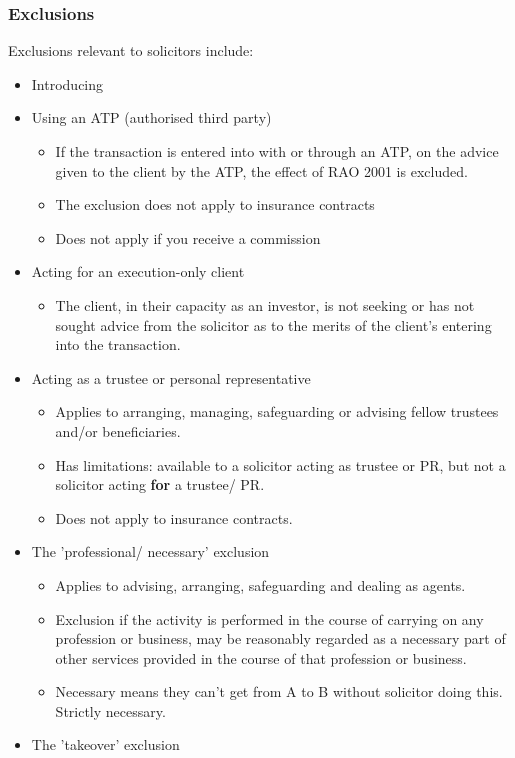 \documentclass[
]{article}
\providecommand{\tightlist}{%
  \setlength{\itemsep}{0pt}\setlength{\parskip}{0pt}}
\begin{document}
\hypertarget{exclusions}{%
\subsubsection{Exclusions}\label{exclusions}}

Exclusions relevant to solicitors include:

\begin{itemize}
\tightlist
\item
  Introducing
\item
  Using an ATP (authorised third party)

  \begin{itemize}
  \tightlist
  \item
    If the transaction is entered into with or through an ATP, on the
    advice given to the client by the ATP, the effect of RAO 2001 is
    excluded.
  \item
    The exclusion does not apply to insurance contracts
  \item
    Does not apply if you receive a commission
  \end{itemize}
\item
  Acting for an execution-only client

  \begin{itemize}
  \tightlist
  \item
    The client, in their capacity as an investor, is not seeking or has
    not sought advice from the solicitor as to the merits of the
    client's entering into the transaction.
  \end{itemize}
\item
  Acting as a trustee or personal representative

  \begin{itemize}
  \tightlist
  \item
    Applies to arranging, managing, safeguarding or advising fellow
    trustees and/or beneficiaries.
  \item
    Has limitations: available to a solicitor acting as trustee or PR,
    but not a solicitor acting \textbf{for} a trustee/ PR.
  \item
    Does not apply to insurance contracts.
  \end{itemize}
\item
  The 'professional/ necessary' exclusion

  \begin{itemize}
  \tightlist
  \item
    Applies to advising, arranging, safeguarding and dealing as agents.
  \item
    Exclusion if the activity is performed in the course of carrying on
    any profession or business, may be reasonably regarded as a
    necessary part of other services provided in the course of that
    profession or business.
  \item
    Necessary means they can't get from A to B without solicitor doing
    this. Strictly necessary.
  \end{itemize}
\item
  The 'takeover' exclusion


\end{itemize}
\end{document}

